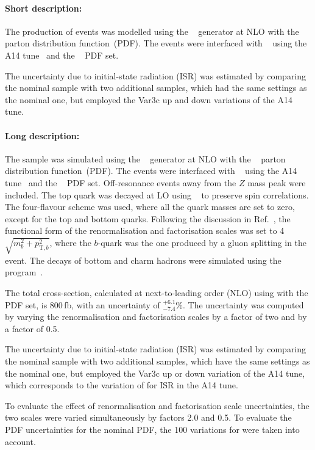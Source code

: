 \paragraph{Short description:}

The production of \tZq events was modelled using the \MGNLO[2.3.3]~\cite{Alwall:2014hca}
generator at NLO with the \NNPDF[3.0nlo]~\cite{Ball:2014uwa} parton distribution function~(PDF).
The events were interfaced with \PYTHIA[8.230]~\cite{Sjostrand:2014zea} using the A14 tune~\cite{ATL-PHYS-PUB-2014-021} and the
\NNPDF[2.3lo]~\cite{Ball:2014uwa} PDF set.

The uncertainty due to initial-state radiation (ISR) was estimated by comparing the nominal \tZq sample with two additional samples,
which had the same settings as the nominal one, but employed the Var3c up and down variations of the A14 tune. 

\paragraph{Long description:}

The \tZq sample was simulated using the \MGNLO[2.3.3]~\cite{Alwall:2014hca}
generator at NLO with the \NNPDF[3.0nlo]~\cite{Ball:2014uwa} parton distribution function~(PDF). The events were interfaced with
\PYTHIA[8.230]~\cite{Sjostrand:2014zea} using the A14 tune~\cite{ATL-PHYS-PUB-2014-021} 
and the \NNPDF[2.3lo]~\cite{Ball:2014uwa} PDF set. Off-resonance events away from the $Z$ mass peak were included. 
The top quark was decayed at LO using \MADSPIN~\cite{Frixione:2007zp,Artoisenet:2012st} to preserve spin correlations.
The four-flavour scheme was used, where all the quark masses are set to zero, except for the top and bottom quarks. 
Following the discussion in Ref.~\cite{Frederix:2012dh}, the functional form of the renormalisation and factorisation scales 
was set to 4$\sqrt{m_b^2+p_{\text{T},b}^2}$, where the $b$-quark was the one produced by a gluon splitting in the event. 
The decays of bottom and charm hadrons were simulated using the \EVTGEN program~\cite{Lange:2001uf}.

The \tZq total cross-section, calculated at next-to-leading order (NLO) using \MGNLO[2.3.3] with the \NNPDF[3.0nlo] PDF set, 
is 800\,fb, with an uncertainty of $^{+6.1}_{-7.4}$\%. The uncertainty was computed by varying the renormalisation and 
factorisation scales by a factor of two and by a factor of 0.5.

The uncertainty due to initial-state radiation (ISR) was estimated by comparing the nominal \tZq sample with two additional samples,
which have the same settings as the nominal one, but employed the Var3c up or down variation of the A14 tune, which
corresponds to the variation of \alphas for ISR in the A14 tune.

To evaluate the effect of renormalisation and factorisation scale uncertainties, the two scales were varied simultaneously by factors 2.0 and 0.5.
To evaluate the PDF uncertainties for the nominal PDF, the 100 variations for \NNPDF[2.3lo] were taken into account. 
